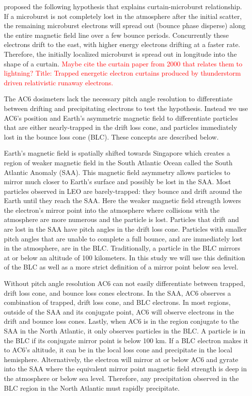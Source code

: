 \documentclass[draft]{agujournal2019}
\begin{document}
 proposed the following hypothesis that explains curtain-microburst relationship. If a microburst is not completely lost in the atmosphere after the initial scatter, the remaining microburst electrons will spread out (bounce phase disperse) along the entire magnetic field line over a few bounce periods. Concurrently these electrons drift to the east, with higher energy electrons drifting at a faster rate. Therefore, the initially localized microburst is spread out in longitude into the shape of a curtain. \textcolor{red}{Maybe cite the curtain paper from 2000 that relates them to lightning? Title: Trapped energetic electron curtains produced by thunderstorm driven relativistic runaway electrons.}

The AC6 dosimeters lack the necessary pitch angle resolution to differentiate between drifting and precipitating electrons to test the  hypothesis. Instead we use AC6's position and Earth's asymmetric magnetic field to differentiate particles that are either nearly-trapped in the drift loss cone, and particles immediately lost in the bounce loss cone (BLC). These concepts are described below.

Earth's magnetic field is spatially shifted towards Singapore which creates a region of weaker magnetic field in the South Atlantic Ocean called the South Atlantic Anomaly (SAA). This magnetic field asymmetry allows particles to mirror much closer to Earth's surface and possibly be lost in the SAA. Most particles observed in LEO are barely-trapped: they bounce and drift around the Earth until they reach the SAA. Here the weaker magnetic field strength lowers the electron's mirror point into the atmosphere where collisions with the atmosphere are more numerous and the particle is lost. Particles that drift and are lost in the SAA have pitch angles in the drift loss cone. Particles with smaller pitch angles that are unable to complete a full bounce, and are immediately lost in the atmosphere, are in the BLC. Traditionally, a particle in the BLC mirrors at or below an altitude of 100 kilometers. In this study we will use this definition of the BLC as well as a more strict definition of a mirror point below sea level.

Without pitch angle resolution AC6 can not easily differentiate between trapped, drift loss cone, and bounce loss cones electrons. In the SAA, AC6 observes a combination of trapped, drift loss cone, and BLC electrons. In most regions, outside of the SAA and its conjugate point, AC6 will observe electrons in the drift and bounce loss cones. Lastly, when AC6 is in the region conjugate to the SAA in the North Atlantic, it only observes particles in the BLC. A particle is in the BLC if its conjugate mirror point is below 100 km. If a BLC electron makes it to AC6's altitude, it can be in the local loss cone and precipitate in the local hemisphere. Alternatively, the electron will mirror at or below AC6 and gyrate into the SAA where the equivalent mirror point magnetic field strength is deep in the atmosphere or below sea level. Therefore, any precipitation observed in the BLC region in the North Atlantic must rapidly precipitate.
\end{document}
